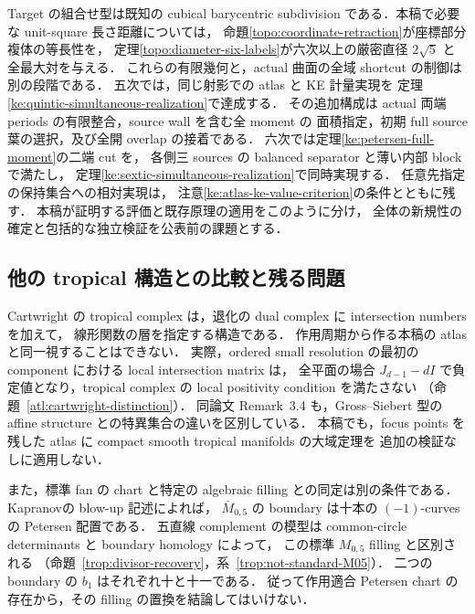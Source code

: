 Target の組合せ型は既知の cubical barycentric subdivision
\cite{BabsonBilleraChan}である．本稿で必要な unit-square 長さ距離については，
命題\ref{topo:coordinate-retraction}が座標部分複体の等長性を，
定理\ref{topo:diameter-six-labels}が六次以上の厳密直径 $2\sqrt5$ と全最大対を与える．
これらの有限幾何と，actual 曲面の全域 shortcut の制御は別の段階である．
五次では，同じ射影での atlas と KE 計量実現を
定理\ref{ke:quintic-simultaneous-realization}で達成する．
その追加構成は actual 両端 periods の有限整合，source wall を含む全 moment の
面積指定，初期 full source 葉の選択，及び全開 overlap の接着である．
六次では定理\ref{ke:petersen-full-moment}の二端 cut を，
各側三 sources の balanced separator と薄い内部 block で満たし，
定理\ref{ke:sextic-simultaneous-realization}で同時実現する．
任意先指定の保持集合への相対実現は，
注意\ref{ke:atlas-ke-value-criterion}の条件とともに残す．
本稿が証明する評価と既存原理の適用をこのように分け，
全体の新規性の確定と包括的な独立検証を公表前の課題とする．

\subsection{他の tropical 構造との比較と残る問題}

Cartwright の tropical complex は，退化の dual complex に intersection numbers を加えて，
線形関数の層を指定する構造である\cite[Definitions~2.5, 2.8; Construction~3.2]{CartwrightComplexes}．
作用周期から作る本稿の atlas と同一視することはできない．
実際，ordered small resolution の最初の component における local intersection matrix は，
全平面の場合 $J_{d-1}-dI$ で負定値となり，tropical complex の local positivity condition を満たさない
（命題~\ref{atl:cartwright-distinction}）．
同論文 Remark~3.4 も，Gross--Siebert 型の affine structure との特異集合の違いを区別している．
本稿でも，focus points を残した atlas に compact smooth tropical manifolds の大域定理を
追加の検証なしに適用しない．

また，標準 fan の chart と特定の algebraic filling との同定は別の条件である．
Kapranov\cite[Theorem~4.3.3]{KapranovChow}の blow-up 記述によれば，
$\overline M_{0,5}$ の boundary は十本の $(-1)$-curves の Petersen 配置である．
五直線 complement の模型は common-circle determinants と boundary homology によって，
この標準 $M_{0,5}$ filling と区別される
（命題~\ref{trop:divisor-recovery}，系~\ref{trop:not-standard-M05}）．
二つの boundary の $b_1$ はそれぞれ十と十一である．
従って作用適合 Petersen chart の存在から，その filling の置換を結論してはいけない．


